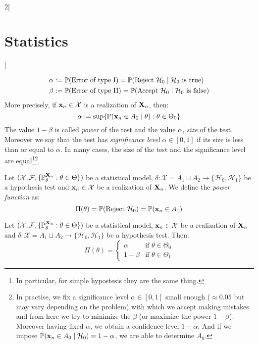 \documentclass[../../../main.tex]{subfiles}
\begin{document}
\begin{multicols}{2}[\section{Statistics}]
\begin{definition}
    \begin{align*}
      \alpha & :=\mathbb{P}(\text{Error of type I})=\mathbb{P}(\text{Reject $\mathcal{H}_0$}\mid\text{$\mathcal{H}_0$ is true})   \\
      \beta  & :=\mathbb{P}(\text{Error of type II})=\mathbb{P}(\text{Accept $\mathcal{H}_0$}\mid\text{$\mathcal{H}_0$ is false})
    \end{align*}
    More precisely, if $\boldsymbol{\mathrm{x}}_n\in\mathcal{X}$ is a realization of $\boldsymbol{\mathrm{X}}_n$, then: $$\alpha:=\sup\{\mathbb{P}(\boldsymbol{\mathrm{x}}_n\in A_1\mid \theta):\theta\in\Theta_0\}$$
    The value $1-\beta$ is called \emph{power} of the test and the value $\alpha$, \emph{size} of the test. Moreover we say that the test has \emph{significance level} $\alpha\in[0,1]$ if its size is less than or equal to $\alpha$. In many cases, the size of the test and the significance level are equal\footnote{In particular, for simple hypostesis they are the same thing.}\footnote{In practise, we fix a significance level $\alpha\in[0,1]$ small enough ($\approx 0.05$ but may vary depending on the problem) with which we accept making mistakes and from here we try to minimize the $\beta$ (or maximize the power $1-\beta$). Moreover having fixed $\alpha$, we obtain a confidence level $1-\alpha$. And if we impose $\mathbb{P}(\boldsymbol{\mathrm{x}}_n\in A_0\mid \mathcal{H}_0)=1-\alpha$, we are able to determine $A_0$.}.
  \end{definition}
  \begin{definition}
    Let $(\mathcal{X},\mathcal{F},\{\mathbb{P}_\theta^{\boldsymbol{\mathrm{X}}_n}:\theta\in\Theta\})$ be a statistical model, $\delta:\mathcal{X}=A_1\sqcup A_2\rightarrow\{\mathcal{H}_0,\mathcal{H}_1\}$ be a hypothesis test and $\boldsymbol{\mathrm{x}}_n\in\mathcal{X}$ be a realization of $\boldsymbol{\mathrm{X}}_n$. We define the \emph{power function} as: $$\Pi(\theta)=\mathbb{P}(\text{Reject $\mathcal{H}_0$})=\mathbb{P}(\boldsymbol{\mathrm{x}}_n\in A_1)$$
  \end{definition}
  \begin{proposition}
    Let $(\mathcal{X},\mathcal{F},\{\mathbb{P}_\theta^{\boldsymbol{\mathrm{X}}_n}:\theta\in\Theta\})$ be a statistical model, $\boldsymbol{\mathrm{x}}_n\in\mathcal{X}$ be a realization of $\boldsymbol{\mathrm{X}}_n$ and $\delta:\mathcal{X}=A_1\sqcup A_2\rightarrow\{\mathcal{H}_0,\mathcal{H}_1\}$ be a hypothesis test. Then:
    $$
      \Pi(\theta)=
      \begin{cases}
        \alpha  & \text{if }\theta\in\Theta_0 \\
        1-\beta & \text{if }\theta\in\Theta_1
      \end{cases}
    $$
  \end{proposition}

\end{multicols}
\end{document}
